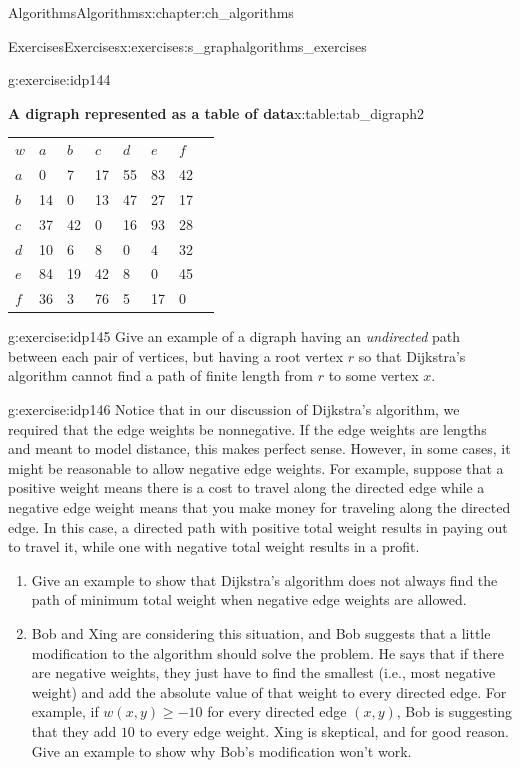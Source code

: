 \documentclass[oneside,10pt,]{book}
\newcommand{\tabularfont}{\relax}
\numberwithin{equation}{section}
\newcommand{\hrulethin}  {\noalign{\hrule height 0.04em}}
\begin{document}
\begin{chapterptx}{Algorithms}{}{Algorithms}{}{}{x:chapter:ch_algorithms}
\begin{exercises-section}{Exercises}{}{Exercises}{}{}{x:exercises:s_graphalgorithms_exercises}
\begin{divisionexercise}{14}{}{}{g:exercise:idp144}
\begin{tableptx}{\textbf{A digraph represented as a table of data}}{x:table:tab_digraph2}{}
\centering%
{\tabularfont%
\begin{tabular}{lAllllll}
\(w\)&\(a\)&\(b\)&\(c\)&\(d\)&\(e\)&\(f\)\tabularnewline\hrulethin
\(a\)&0&7&17&55&83&42\tabularnewline[0pt]
\(b\)&14&0&13&47&27&17\tabularnewline[0pt]
\(c\)&37&42&0&16&93&28\tabularnewline[0pt]
\(d\)&10&6&8&0&4&32\tabularnewline[0pt]
\(e\)&84&19&42&8&0&45\tabularnewline[0pt]
\(f\)&36&3&76&5&17&0
\end{tabular}
}%
\end{tableptx}%
\end{divisionexercise}%
\begin{divisionexercise}{15}{}{}{g:exercise:idp145}%
Give an example of a digraph having an \emph{undirected} path between each pair of vertices, but having a root vertex \(r\) so that Dijkstra's algorithm cannot find a path of finite length from \(r\) to some vertex \(x\).%
\end{divisionexercise}%
\begin{divisionexercise}{16}{}{}{g:exercise:idp146}%
Notice that in our discussion of Dijkstra's algorithm, we required that the edge weights be nonnegative. If the edge weights are lengths and meant to model distance, this makes perfect sense. However, in some cases, it might be reasonable to allow negative edge weights. For example, suppose that a positive weight means there is a cost to travel along the directed edge while a negative edge weight means that you make money for traveling along the directed edge. In this case, a directed path with positive total weight results in paying out to travel it, while one with negative total weight results in a profit.%
\begin{enumerate}[label=(\alph*)]
\item{}Give an example to show that Dijkstra's algorithm does not always find the path of minimum total weight when negative edge weights are allowed.%
\item{}Bob and Xing are considering this situation, and Bob suggests that a little modification to the algorithm should solve the problem. He says that if there are negative weights, they just have to find the smallest (i.e.\@, most negative weight) and add the absolute value of that weight to every directed edge. For example, if \(w(x,y)\geq -10\) for every directed edge \((x,y)\), Bob is suggesting that they add \(10\) to every edge weight. Xing is skeptical, and for good reason. Give an example to show why Bob's modification won't work.%
\end{enumerate}
%
\end{divisionexercise}%
\end{exercises-section}
\end{chapterptx}
\end{document}

